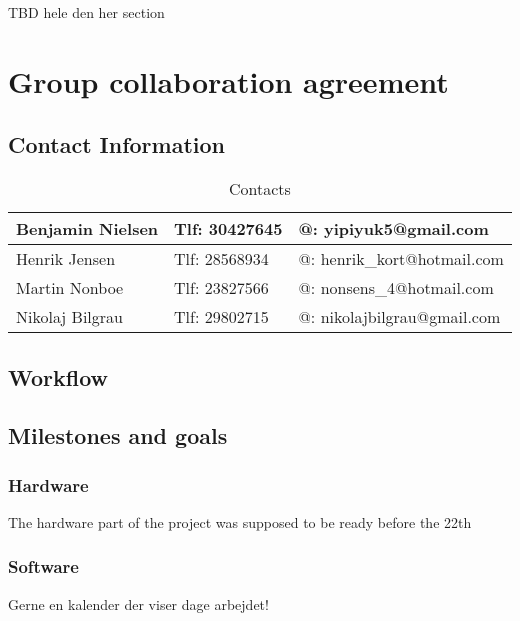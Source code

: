 TBD hele den her section
\section{Group collaboration agreement}
\subsection{Contact Information}
\begin{table}[h!]
\centering
\caption{Contacts}
\label{Contact info}
\begin{tabular}{|l|l|l|}
\hline
Benjamin Nielsen & Tlf: 30427645 & @: yipiyuk5@gmail.com       \\ \hline
Henrik Jensen    & Tlf: 28568934 & @: henrik\_kort@hotmail.com \\ \hline
Martin Nonboe    & Tlf: 23827566 & @: nonsens\_4@hotmail.com   \\ \hline
Nikolaj Bilgrau  & Tlf: 29802715 & @: nikolajbilgrau@gmail.com \\ \hline
\end{tabular}
\end{table}

\subsection{Workflow}

\subsection{Milestones and goals}
\subsubsection{Hardware}
The hardware part of the project was supposed to be ready before the 22th 
\subsubsection{Software}
Gerne en kalender der viser dage arbejdet!